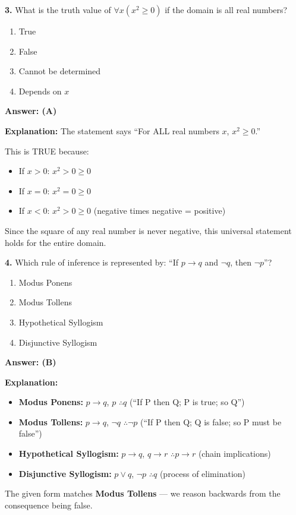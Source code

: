 \documentclass[11pt,a4paper]{article}
\begin{document}
\vspace{10pt}

\textbf{3.} What is the truth value of $\forall x (x^2 \geq 0)$ if the domain is all real numbers?

\begin{enumerate}[label=(\Alph*),noitemsep]
    \item True
    \item False
    \item Cannot be determined
    \item Depends on $x$
\end{enumerate}

\begin{solnbox}
\textbf{Answer: (A)}

\textbf{Explanation:} The statement says ``For ALL real numbers $x$, $x^2 \geq 0$.''

This is TRUE because:
\begin{itemize}[noitemsep]
    \item If $x > 0$: $x^2 > 0 \geq 0$ \checkmark
    \item If $x = 0$: $x^2 = 0 \geq 0$ \checkmark
    \item If $x < 0$: $x^2 > 0 \geq 0$ \checkmark (negative times negative = positive)
\end{itemize}

Since the square of any real number is never negative, this universal statement holds for the entire domain.
\end{solnbox}

\vspace{10pt}

\textbf{4.} Which rule of inference is represented by: ``If $p \to q$ and $\neg q$, then $\neg p$''?

\begin{enumerate}[label=(\Alph*),noitemsep]
    \item Modus Ponens
    \item Modus Tollens
    \item Hypothetical Syllogism
    \item Disjunctive Syllogism
\end{enumerate}

\begin{solnbox}
\textbf{Answer: (B)}

\textbf{Explanation:} 
\begin{itemize}[noitemsep]
    \item \textbf{Modus Ponens:} $p \to q$, $p$ $\therefore q$ (``If P then Q; P is true; so Q'')
    \item \textbf{Modus Tollens:} $p \to q$, $\neg q$ $\therefore \neg p$ (``If P then Q; Q is false; so P must be false'')
    \item \textbf{Hypothetical Syllogism:} $p \to q$, $q \to r$ $\therefore p \to r$ (chain implications)
    \item \textbf{Disjunctive Syllogism:} $p \lor q$, $\neg p$ $\therefore q$ (process of elimination)
\end{itemize}

The given form matches \textbf{Modus Tollens} --- we reason backwards from the consequence being false.
\end{solnbox}
\end{document}
